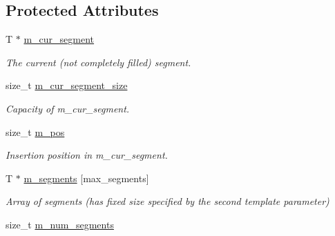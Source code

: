 \subsection*{Protected Attributes}
\begin{DoxyCompactItemize}
\item 
\hypertarget{classtbb_1_1internal_1_1fast__reverse__vector_ab9897f3ce81f20cf99dff112b1938ced}{}T $\ast$ \hyperlink{classtbb_1_1internal_1_1fast__reverse__vector_ab9897f3ce81f20cf99dff112b1938ced}{m\+\_\+cur\+\_\+segment}\label{classtbb_1_1internal_1_1fast__reverse__vector_ab9897f3ce81f20cf99dff112b1938ced}

\begin{DoxyCompactList}\small\item\em The current (not completely filled) segment. \end{DoxyCompactList}\item 
\hypertarget{classtbb_1_1internal_1_1fast__reverse__vector_a7c6128f417a2909e3ecf1cc95fd8f320}{}size\+\_\+t \hyperlink{classtbb_1_1internal_1_1fast__reverse__vector_a7c6128f417a2909e3ecf1cc95fd8f320}{m\+\_\+cur\+\_\+segment\+\_\+size}\label{classtbb_1_1internal_1_1fast__reverse__vector_a7c6128f417a2909e3ecf1cc95fd8f320}

\begin{DoxyCompactList}\small\item\em Capacity of m\+\_\+cur\+\_\+segment. \end{DoxyCompactList}\item 
\hypertarget{classtbb_1_1internal_1_1fast__reverse__vector_a0af5dd83f99b08e51d285daa5cc40abd}{}size\+\_\+t \hyperlink{classtbb_1_1internal_1_1fast__reverse__vector_a0af5dd83f99b08e51d285daa5cc40abd}{m\+\_\+pos}\label{classtbb_1_1internal_1_1fast__reverse__vector_a0af5dd83f99b08e51d285daa5cc40abd}

\begin{DoxyCompactList}\small\item\em Insertion position in m\+\_\+cur\+\_\+segment. \end{DoxyCompactList}\item 
\hypertarget{classtbb_1_1internal_1_1fast__reverse__vector_a6d31f5464b691bd89594fe0c39859835}{}T $\ast$ \hyperlink{classtbb_1_1internal_1_1fast__reverse__vector_a6d31f5464b691bd89594fe0c39859835}{m\+\_\+segments} \mbox{[}max\+\_\+segments\mbox{]}\label{classtbb_1_1internal_1_1fast__reverse__vector_a6d31f5464b691bd89594fe0c39859835}

\begin{DoxyCompactList}\small\item\em Array of segments (has fixed size specified by the second template parameter) \end{DoxyCompactList}\item 
\hypertarget{classtbb_1_1internal_1_1fast__reverse__vector_afd83fe490bf888185e32b9dc09c32308}{}size\+\_\+t \hyperlink{classtbb_1_1internal_1_1fast__reverse__vector_afd83fe490bf888185e32b9dc09c32308}{m\+\_\+num\+\_\+segments}\label{classtbb_1_1internal_1_1fast__reverse__vector_afd83fe490bf888185e32b9dc09c32308}


\end{DoxyCompactItemize}
